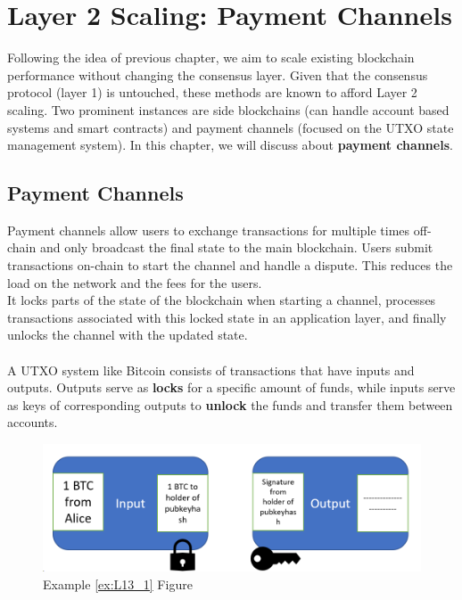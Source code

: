 \chapter{Layer 2 Scaling: Payment Channels}
Following the idea of previous chapter, we aim to scale existing blockchain performance without changing the consensus layer. Given that the consensus protocol (layer 1) is untouched, these methods are known to afford Layer 2 scaling. Two prominent
instances are side blockchains (can handle account based systems and smart contracts) and payment channels (focused on the UTXO state management system). In this chapter, we will discuss about \textbf{payment channels}.

\section{Payment Channels}
Payment channels allow users to exchange transactions for multiple times off-chain and only broadcast the final state to the main blockchain. Users submit transactions on-chain to start the channel and handle a dispute. This reduces the load on the network and the fees for the users. \\
It locks parts of the state of the blockchain when starting a channel, processes transactions associated with this locked state in an application layer, and finally unlocks the channel with the updated state.\\\\
A UTXO system like Bitcoin consists of transactions that have inputs and outputs. Outputs serve as \textbf{locks} for a specific amount of funds, while inputs serve as keys of corresponding outputs to \textbf{unlock} the funds and transfer them between accounts.

\begin{figure}[h!]
	\centering
	\includegraphics[width=0.7\linewidth]{Fig/13/F1}
	\caption{Example \ref{ex:L13_1} Figure}
	\label{fig:L13_f1}
\end{figure}

